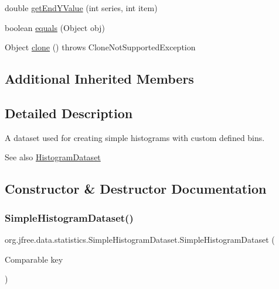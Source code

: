 \begin{DoxyCompactItemize}
\item 
double \mbox{\hyperlink{classorg_1_1jfree_1_1data_1_1statistics_1_1_simple_histogram_dataset_af8a27ec1e56f24f0530bc724c58ac2e5}{get\+End\+Y\+Value}} (int series, int item)
\item 
boolean \mbox{\hyperlink{classorg_1_1jfree_1_1data_1_1statistics_1_1_simple_histogram_dataset_ac22edc5e1bbd03e58dc75f46eff9c6e2}{equals}} (Object obj)
\item 
Object \mbox{\hyperlink{classorg_1_1jfree_1_1data_1_1statistics_1_1_simple_histogram_dataset_ad2fb603f5387b44e2525c271612aa82f}{clone}} ()  throws Clone\+Not\+Supported\+Exception 
\end{DoxyCompactItemize}
\subsection*{Additional Inherited Members}


\subsection{Detailed Description}
A dataset used for creating simple histograms with custom defined bins.

\begin{DoxySeeAlso}{See also}
\mbox{\hyperlink{classorg_1_1jfree_1_1data_1_1statistics_1_1_histogram_dataset}{Histogram\+Dataset}} 
\end{DoxySeeAlso}


\subsection{Constructor \& Destructor Documentation}
\mbox{\label{classorg_1_1jfree_1_1data_1_1statistics_1_1_simple_histogram_dataset_ae571e1e6a2928b504d4b0bdaeca21718}} 
\subsubsection{\texorpdfstring{Simple\+Histogram\+Dataset()}{SimpleHistogramDataset()}}
{\footnotesize\ttfamily org.\+jfree.\+data.\+statistics.\+Simple\+Histogram\+Dataset.\+Simple\+Histogram\+Dataset (\begin{DoxyParamCaption}\item[{Comparable}]{key }\end{DoxyParamCaption})}

